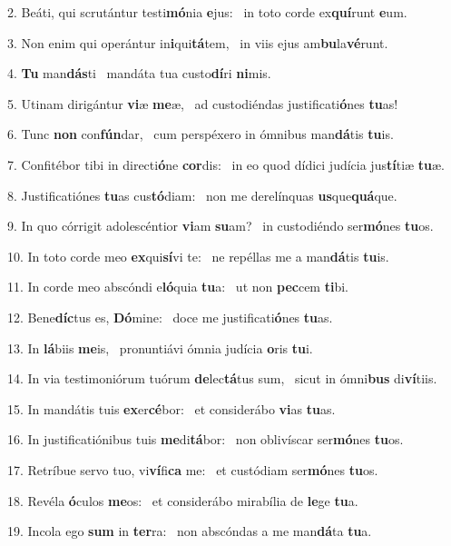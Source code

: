 2. Beáti, qui scrutántur testi\textbf{mó}nia \textbf{e}jus: \ast\  in toto corde ex\textbf{quí}runt \textbf{e}um.\

3. Non enim qui operántur in\textbf{i}qui\textbf{tá}tem, \ast\  in viis ejus am\textbf{bu}la\textbf{vé}runt.\

4. \textbf{Tu} man\textbf{dás}ti \ast\  mandáta tua custo\textbf{dí}ri \textbf{ni}mis.\

5. Utinam dirigántur \textbf{vi}æ \textbf{me}æ, \ast\  ad custodiéndas justificati\textbf{ó}nes \textbf{tu}as!\

6. Tunc \textbf{non} con\textbf{fún}dar, \ast\  cum perspéxero in ómnibus man\textbf{dá}tis \textbf{tu}is.\

7. Confitébor tibi in directi\textbf{ó}ne \textbf{cor}dis: \ast\  in eo quod dídici judícia jus\textbf{tí}tiæ \textbf{tu}æ.\

8. Justificatiónes \textbf{tu}as cus\textbf{tó}diam: \ast\  non me derelínquas \textbf{us}que\textbf{quá}que.\

9. In quo córrigit adolescéntior \textbf{vi}am \textbf{su}am? \ast\  in custodiéndo ser\textbf{mó}nes \textbf{tu}os.\

10. In toto corde meo \textbf{ex}qui\textbf{sí}vi te: \ast\  ne repéllas me a man\textbf{dá}tis \textbf{tu}is.\

11. In corde meo abscóndi e\textbf{ló}quia \textbf{tu}a: \ast\  ut non \textbf{pec}cem \textbf{ti}bi.\

12. Bene\textbf{díc}tus es, \textbf{Dó}mine: \ast\  doce me justificati\textbf{ó}nes \textbf{tu}as.\

13. In \textbf{lá}biis \textbf{me}is, \ast\  pronuntiávi ómnia judícia \textbf{o}ris \textbf{tu}i.\

14. In via testimoniórum tuórum \textbf{de}lec\textbf{tá}tus sum, \ast\  sicut in ómni\textbf{bus} di\textbf{ví}tiis.\

15. In mandátis tuis \textbf{ex}er\textbf{cé}bor: \ast\  et considerábo \textbf{vi}as \textbf{tu}as.\

16. In justificatiónibus tuis \textbf{me}di\textbf{tá}bor: \ast\  non oblivíscar ser\textbf{mó}nes \textbf{tu}os.\

17. Retríbue servo tuo, vi\textbf{ví}fi\textbf{ca} me: \ast\  et custódiam ser\textbf{mó}nes \textbf{tu}os.\

18. Revéla \textbf{ó}culos \textbf{me}os: \ast\  et considerábo mirabília de \textbf{le}ge \textbf{tu}a.\

19. Incola ego \textbf{sum} in \textbf{ter}ra: \ast\  non abscóndas a me man\textbf{dá}ta \textbf{tu}a.\

